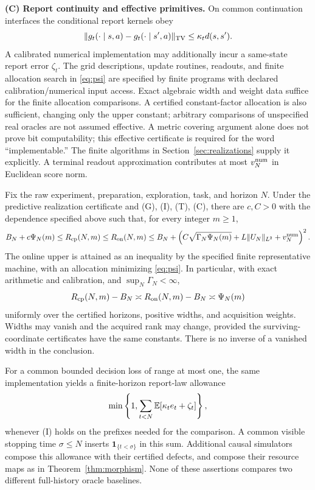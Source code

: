 \smallskip\noindent\textbf{(C) Report continuity and effective primitives.}
On common continuation interfaces the conditional report kernels obey
\begin{equation}\label{eq:report}
 \lVert g_t(\cdot\mid s,a)-g_t(\cdot\mid s',a)\rVert_{\mathrm{TV}}\le\kappa_t d(s,s').
\end{equation}
A calibrated numerical implementation may additionally incur a same-state report error $\zeta_t$. The grid descriptions, update routines, readouts, and finite allocation search in \eqref{eq:psi} are specified by finite programs with declared calibration/numerical input access. Exact algebraic width and weight data suffice for the finite allocation comparisons. A certified constant-factor allocation is also sufficient, changing only the upper constant; arbitrary comparisons of unspecified real oracles are not assumed effective. A metric covering argument alone does not prove bit computability; this effective certificate is required for the word ``implementable.'' The finite algorithms in Section~\ref{sec:realizations} supply it explicitly. A terminal readout approximation contributes at most $v_N^{\rm num}$ in Euclidean score norm.

\begin{theorem}\label{thm:main}
Fix the raw experiment, preparation, exploration, task, and horizon $N$. Under the predictive realization certificate and \textup{(G), (I), (T), (C)}, there are $c,C>0$ with the dependence specified above such that, for every integer $m\ge1$,
\begin{equation}\label{eq:main}
 B_N+c\Psi_N(m)\le R_{\mathrm{cp}}(N,m)\le R_{\mathrm{on}}(N,m)
 \le B_N+\left(C\sqrt{\Gamma_N\Psi_N(m)}
             +L\lVert U_N\rVert_{L^2}+v_N^{\rm num}\right)^2.
\end{equation}
The online upper is attained as an inequality by the specified finite representative machine, with an allocation minimizing \eqref{eq:psi}. In particular, with exact arithmetic and calibration, and $\sup_N\Gamma_N<\infty$,
\begin{equation}\label{eq:matching}
 R_{\mathrm{cp}}(N,m)-B_N\asymp R_{\mathrm{on}}(N,m)-B_N\asymp\Psi_N(m)
\end{equation}
uniformly over the certified horizons, positive widths, and acquisition weights. Widths may vanish and the acquired rank may change, provided the surviving-coordinate certificates have the same constants. There is no inverse of a vanished width in the conclusion.

For a common bounded decision loss of range at most one, the same implementation yields a finite-horizon report-law allowance
\begin{equation}\label{eq:pathallowance}
 \min\left\{1,\sum_{t<N}\mathbb E[\kappa_t e_t+\zeta_t]\right\},
\end{equation}
whenever \textup{(I)} holds on the prefixes needed for the comparison. A common visible stopping time $\sigma\le N$ inserts $\mathbf1_{\{t<\sigma\}}$ in this sum. Additional causal simulators compose this allowance with their certified defects, and compose their resource maps as in Theorem~\ref{thm:morphism}. None of these assertions compares two different full-history oracle baselines.
\end{theorem}

